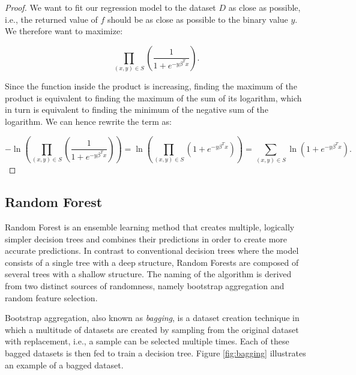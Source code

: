 \begin{proof}
    We want to fit our regression model to the dataset $D$ as close as possible, i.e., the returned value of $f$ should be as close as possible to the binary value $y$. We therefore want to maximize:
    
    \[ \prod_{(x, y) \in S} \left(\frac{1}{ 1  + e^{-y \beta^T x}} \right). \]

    Since the function inside the product is increasing, finding the maximum of the product is equivalent to finding the maximum of the sum of its logarithm, which in turn is equivalent to finding the minimum of the negative sum of the logarithm. We can hence rewrite the term as:

    \[
        - \ln \left( \prod_{(x, y) \in S} \left(\frac{1}{ 1  + e^{-y \beta^T x}} \right) \right) = \ln \left( \prod_{(x, y) \in S} \left( 1  + e^{-y \beta^T x} \right) \right) = \sum_{(x, y) \in S} \ln \left( 1  + e^{-y \beta^T x} \right).
    \]
\end{proof}

\subsection{Random Forest}

Random Forest is an ensemble learning method that creates multiple, logically simpler decision trees and combines their predictions in order to create more accurate predictions. In contrast to conventional decision trees where the model consists of a single tree with a deep structure, Random Forests are composed of several trees with a shallow structure. The naming of the algorithm is derived from two distinct sources of randomness, namely bootstrap aggregation and random feature selection.

Bootstrap aggregation, also known as \emph{bagging}, is a dataset creation technique in which a multitude of datasets are created by sampling from the original dataset with replacement, i.e., a sample can be selected multiple times. Each of these bagged datasets is then fed to train a decision tree. Figure \ref{fig:bagging} illustrates an example of a bagged dataset.

